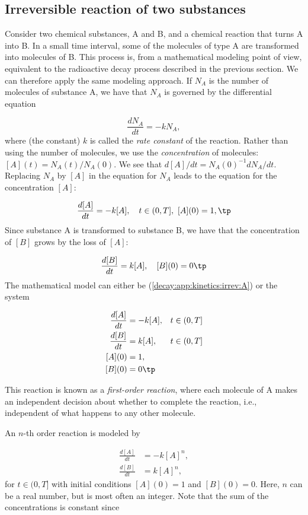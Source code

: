 \documentclass[graybox,sectrefs,envcountresetchap,open=right,final]{svmonodo}
\begin{document}

\subsection{Irreversible reaction of two substances}

Consider two chemical substances, A and B, and a chemical reaction that
turns A into B. In a small time interval, some of the
molecules of type A are transformed into molecules of B. This process is,
from a mathematical modeling point of view, equivalent to the
radioactive decay process described in the previous section. We can
therefore apply the same modeling approach. If $N_A$ is the number of
molecules of substance A, we have that $N_A$ is governed by the
differential equation

\[ \frac{dN_A}{dt} = -kN_A,\]
where (the constant) $k$ is called the \emph{rate constant} of the reaction.
Rather than using the number of molecules, we use the \emph{concentration}
of molecules: $[A](t) = N_A(t)/N_A(0)$.
We see that $d[A]/dt = N_A(0)^{-1} dN_A/dt$.
Replacing $N_A$ by $[A]$ in the equation for $N_A$ leads to the equation
for the concentration $[A]$:

\begin{equation}
\frac{d[A]}{dt} = -k[A],\quad t\in (0,T],\ [A](0)=1, \tp
\label{decay:app:kinetics:irrev:A}
\end{equation}
Since substance A is transformed to substance B, we have that the concentration
of $[B]$ grows by the loss of $[A]$:

\[
\frac{d[B]}{dt} = k[A],\quad [B](0)=0\tp
\]
The mathematical model can either be (\ref{decay:app:kinetics:irrev:A}) or
the system

\begin{align}
\frac{d[A]}{dt} &= -k[A], &t\in (0,T]\\ 
\frac{d[B]}{dt} &= k[A], &t\in (0,T]\\ 
[A](0) &= 1,\\ 
[B](0) &= 0\tp
\end{align}

This reaction is known as a \emph{first-order reaction}, where each molecule of
A makes an independent decision about whether to complete the reaction,
i.e., independent of what happens to any other molecule.

An $n$-th order reaction is modeled by

\begin{align}
\frac{d[A]}{dt} &= -k[A]^n,\\ 
\frac{d[B]}{dt} &= k[A]^n,
\end{align}
for $t\in (0,T]$ with initial conditions $[A](0) = 1$ and
$[B](0) = 0$. Here, $n$ can be a real number,
but is most often an integer. Note that
the sum of the concentrations is constant since
\end{document}
